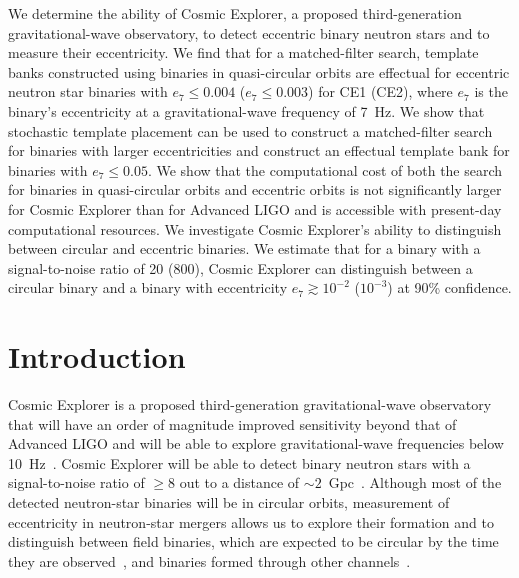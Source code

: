 We determine the ability of Cosmic Explorer, a proposed third-generation gravitational-wave observatory, to detect eccentric binary neutron stars and to measure their eccentricity. We find that for a matched-filter search, template banks constructed using binaries in quasi-circular orbits are effectual for eccentric neutron star binaries with $e_{7} \leq 0.004$ ($e_{7} \leq 0.003$) for CE1 (CE2), where $e_7$ is the binary's eccentricity at a gravitational-wave frequency of 7~Hz. We show that stochastic template placement can be used to construct a matched-filter search for binaries with larger eccentricities and construct an effectual template bank for binaries with $e_{7} \leq 0.05$. We show that the computational cost of both the search for binaries in quasi-circular orbits and eccentric orbits is not significantly larger for Cosmic Explorer than for Advanced LIGO and is accessible with present-day computational resources. We investigate Cosmic Explorer's ability to distinguish between circular and eccentric binaries. We estimate that for a binary with a signal-to-noise ratio of 20 (800), Cosmic Explorer can distinguish between a circular binary and a binary with eccentricity $e_7 \gtrsim 10^{-2}$ ($10^{-3}$) at 90\% confidence.

\section{\label{sec:3G-Intro}Introduction}

Cosmic Explorer is a proposed third-generation gravitational-wave observatory that will have an order of magnitude improved sensitivity beyond that of Advanced LIGO and will be able to explore gravitational-wave frequencies below 10~Hz~\cite{Reitze:2019iox}. Cosmic Explorer will be able to detect binary neutron stars with a signal-to-noise ratio of $\ge 8$ out to a distance of $\sim 2$~Gpc~\cite{Chen:2017wpg}. Although most of the detected neutron-star binaries will be in circular orbits, measurement of eccentricity in neutron-star mergers allows us to explore their formation and to distinguish between field binaries, which are expected to be circular by the time they are observed~\cite{Peters:1964zz}, and binaries formed through other channels~\cite{Smarr1976,Canal:1990dz,PortegiesZwart1:1997zn,Postnov:2006hka,Kalogera:2006uj,Kowalska:2010qg,Beniamini:2015uta,Tauris:2017omb,Palmese:2017yhz,Belczynski:2018ptv,Vigna-Gomez:2018dza,Giacobbo:2018etu,Mapelli:2018wys,Andrews:2019vou}.


